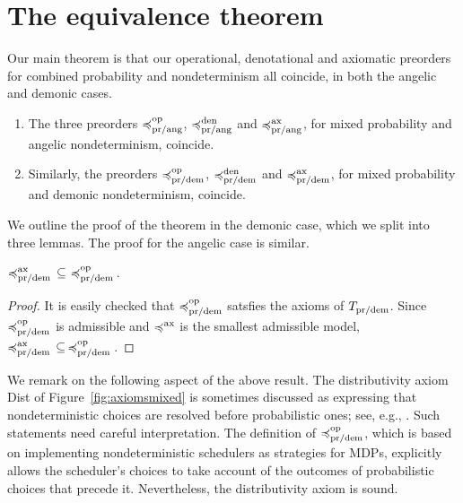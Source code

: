 \section{The equivalence theorem}
\label{section:equivalence}

Our main theorem is that our operational, denotational and axiomatic preorders for combined probability and nondeterminism all coincide, in both the angelic and demonic cases.
\begin{theorem} \leavevmode
\begin{enumerate} 
\item The three preorders $\preccurlyeq^{\text{op}}_{\text{pr/ang}}$, $\preccurlyeq^{\text{den}}_{\text{pr/ang}}$ and $\preccurlyeq^{\text{ax}}_{\text{pr/ang}}$, for mixed probability and angelic nondeterminism, coincide.

\item Similarly, the preorders $\preccurlyeq^{\text{op}}_{\text{pr/dem}}$, $\preccurlyeq^{\text{den}}_{\text{pr/dem}}$ and $\preccurlyeq^{\text{ax}}_{\text{pr/dem}}$,
for mixed probability and demonic nondeterminism, coincide.
\end{enumerate}
\end{theorem}

\noindent
We outline the proof of the theorem in the demonic case, which we split into three lemmas. The proof for the angelic case is similar. 
\begin{lemma}
${\preccurlyeq^{\text{ax}}_{\text{pr/dem}}} \, \subseteq \, \, \preccurlyeq^{\text{op}}_{\text{pr/dem}}\,$.
\end{lemma}
\begin{proof}
 It is easily checked that $\preccurlyeq^{\text{op}}_{\text{pr/dem}}$ satsfies the axioms
 of $T_{\text{pr/dem}}$.  Since $\preccurlyeq^{\text{op}}_{\text{pr/dem}}$ is admissible and 
$\preccurlyeq^{\text{ax}}$ is the smallest admissible model, ${\preccurlyeq^{\text{ax}}_{\text{pr/dem}}} \, \subseteq \, \preccurlyeq^{\text{op}}_{\text{pr/dem}}\,$.
\end{proof}
%
\noindent
We remark on the following aspect of the above result.
The distributivity axiom Dist of Figure~\ref{fig:axiomsmixed} is sometimes discussed as expressing that  nondeterministic choices  are  resolved before probabilistic ones; see, e.g., \cite{KeimelP2016}. Such statements need careful interpretation. 
The definition of $\preccurlyeq^{\text{op}}_{\text{pr/dem}}$, which is based on implementing nondeterministic schedulers as strategies for MDPs,
explicitly allows the  scheduler's choices to take account of the outcomes of probabilistic choices that precede it. Nevertheless, the distributivity axiom is sound.

